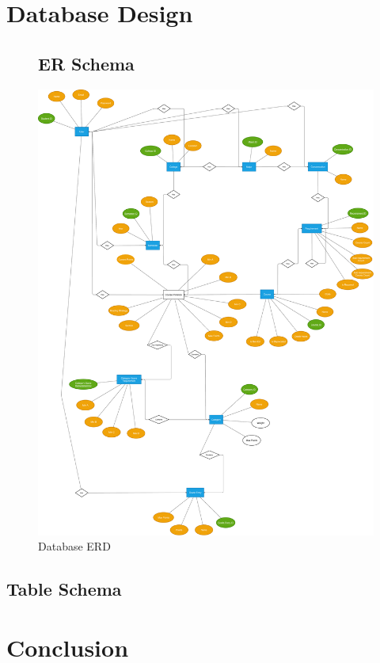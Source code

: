 \documentclass[12pt]{article}
\begin{document}
\begin{enumerate}
\begin{enumerate}
\section{Database Design}

\begin{figure}[p!]
  \subsection{ER Schema}
  \centering
  \includegraphics[width=\linewidth]{database_erd.pdf}
  \caption{Database ERD}
\end{figure}

\clearpage

\subsection{Table Schema}

\section{Conclusion}


\end{enumerate}
\end{enumerate}
\end{document}
